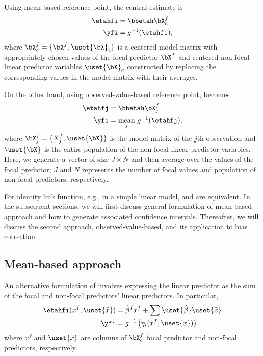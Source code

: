 Using mean-based reference point, the central estimate is
%
\begin{align}\label{eq:eta_linear_mean}
\etahfi &= \bbetah \bX^{f}_c \nonumber\\
\yfi &= g^{-1}(\etahfi),
\end{align}
%
where $\bX^{f}_c = \{\bX^{f}, \uset{{\bX}}_c\}$ is a centered model matrix with appropriately chosen values of the focal predictor $\bX^{f}$ and centered non-focal linear predictor variables $\uset{{\bX}}_c$ constructed by replacing the corresponding values in the model matrix with their averages. 

On the other hand, using observed-value-based reference point, 
becomes
%
\begin{align}\label{eq:eta_linear_sample}
\etahfj &= \bbetah \bX^{f}_j \nonumber\\
\yfi  &= \underset{j}{\textrm{mean}} ~ g^{-1} (\etahfj),
\end{align}
%
where $\bX^{f}_j = \{X^{f}_j, \uset{{\bX}}\}$ is the model matrix of the $j$th
observation and $\uset{{\bX}}$ is the entire population of the non-focal linear
predictor variables. Here, we generate a vector of size $J \times N$ and then average over the values of the focal predictor; $J$ and $N$ represents the number of focal values and population of non-focal predictors, respectively.

For identity link function, e.g., in a simple linear model,  and  are equivalent. In the subsequent sections, we will first discuss general formulation of mean-based approach and how to generate associated confidence intervals. Thereafter, we will discuss the second approach, observed-value-based, and its application to bias correction.


\subsection{Mean-based approach}

An alternative formulation of  involves expressing the linear predictor as the sum of the focal and non-focal predictors' linear predictors. In particular, 
%
\begin{align}\label{eq:eta_mean}
\etahfi(x^f, \uset{{\bar{x}}}) &= \hat{\beta}^f x^f + \sum \uset{\hat{\beta}} \uset{{\bar{x}}} \\
\yfi  &= g^{-1} \left(\eta_i(x^f, \uset{{\bar{x}}})\right)
\end{align}
where $x^f$ and $\uset{{\bar{x}}}$ are columns of $\bX^{f}_c$ focal predictor and non-focal predictors, respectively.

